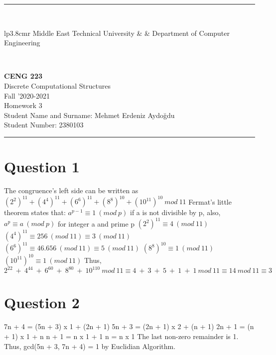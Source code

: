 \documentclass[12pt]{article}
\newcommand{\HRule}{\rule{\linewidth}{1mm}}
\begin{document}
\noindent
\HRule \\[3mm]
\small
\begin{tabular}[b]{lp{3.8cm}r}
{} Middle East Technical University &  &
{} Department of Computer Engineering \\
\end{tabular} \\
\begin{center}

                 \LARGE \textbf{CENG 223} \\[4mm]
                 \Large Discrete Computational Structures \\[4mm]
                \normalsize Fall '2020-2021 \\
                    \Large Homework 3 \\
                \normalsize Student Name and Surname: Mehmet Erdeniz Aydoğdu \\
                \normalsize Student Number:  2380103\\
\end{center}
\HRule


\section*{Question 1}
The congruence's left side can be written as $(2^2)^{11} + (4^4)^{11} + (6^6)^{11} + (8^8)^{10} + (10^{11})^{10}\:mod\:11$ \newline
Fermat's little theorem states that: \newline \newline
$a^{p-1} \equiv 1\:(mod\:p)$ if a is not divisible by p, also,\newline
$a^p \equiv a\:(mod\:p)$ for integer a and prime p \newline\newline
$(2^2)^{11} \equiv 4\:(mod\:11)$ \newline
$(4^4)^{11} \equiv 256\:(mod\:11) \equiv 3\:(mod\:11)$ \newline
$(6^6)^{11} \equiv 46.656\:(mod\:11) \equiv 5\:(mod\:11)$ \newline
$(8^8)^{10} \equiv 1\:(mod\:11)$ \newline
$(10^{11})^{10} \equiv 1\:(mod\:11)$ Thus, \newline \newline
$2^{22}\:+\:4^{44}\:+\:6^{60}\:+\:8^{80}\:+\:10^{110}\:mod\:11 \equiv 4\:+\:3\:+\:5\:+\:1\:+\:1\:mod\:11 \equiv 14\:mod\:11 \equiv 3$
\section*{Question 2}
7n + 4 = (5n + 3) x 1 + (2n + 1) \newline
5n + 3 = (2n + 1) x 2 + (n + 1) \newline
2n + 1 = (n + 1) x 1 + n \newline
n + 1 = n x 1 + 1 \newline
n = n x 1 \newline
The last non-zero remainder is 1. Thus, gcd(5n + 3, 7n + 4) = 1 by Euclidian Algorithm.
\end{document}
